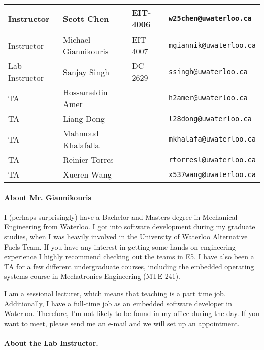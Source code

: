 \documentclass[letterpaper,10pt]{article}
\begin{document}
\begin{table}[h]
        \begin{center}
        \begin{tabular}{l|l|l|l}
        Instructor & Scott Chen & EIT-4006 & \texttt{w25chen@uwaterloo.ca} \\
        \hline
        Instructor & Michael Giannikouris & EIT-4007 & \texttt{mgiannik@uwaterloo.ca} \\
        \hline
        Lab Instructor & Sanjay Singh & DC-2629 & \texttt{ssingh@uwaterloo.ca}\\
        \hline
        TA & Hossameldin Amer &  & \texttt{h2amer@uwaterloo.ca} \\
        TA & Liang Dong &  & \texttt{l28dong@uwaterloo.ca} \\
        TA & Mahmoud Khalafalla &  & \texttt{mkhalafa@uwaterloo.ca} \\
        TA & Reinier Torres & & \texttt{rtorresl@uwaterloo.ca} \\
        TA & Xueren Wang & & \texttt{x537wang@uwaterloo.ca} \\
        \end{tabular}
        \end{center}
\end{table}


\paragraph{About Mr. Giannikouris}
I (perhaps surprisingly) have a Bachelor and Masters degree in Mechanical Engineering from Waterloo. I got into software development during my graduate studies, when I was heavily involved in the University of Waterloo Alternative Fuels Team. If you have any interest in getting some hands on engineering experience I highly recommend checking out the teams in E5. I have also been a TA for a few different undergraduate courses, including the embedded operating systems course in Mechatronics Engineering (MTE 241).

I am a sessional lecturer, which means that teaching is a part time job. Additionally, I have a full-time job as an embedded software developer in Waterloo. Therefore, I'm not likely to be found in my office during the day. If you want to meet, please send me an e-mail and we will set up an appointment.

\paragraph{About the Lab Instructor.}
\end{document}
